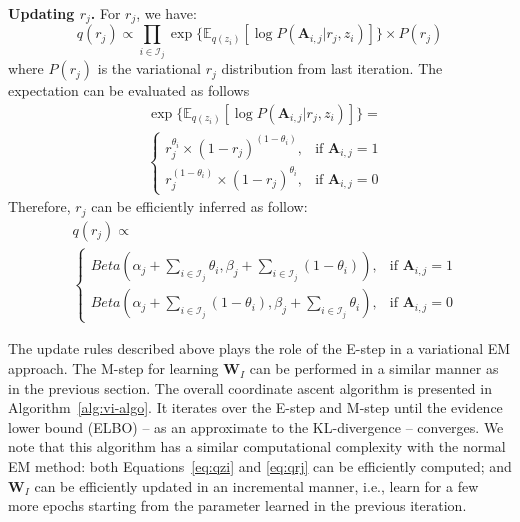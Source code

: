 \smallskip
\noindent\textbf{Updating $r_j$.}  For $r_j$, we have:
%
\begin{equation}
    q(r_j) \propto \prod_{i \in \mathcal{I}_j} \exp{\{\mathbb{E}_{q(z_i)}[\log{P(\mathbf{A}_{i,j}|r_j,z_i)}]\}} \times   {P(r_j)}
\end{equation}
%
where $P(r_j)$ is the variational $r_j$ distribution from last iteration. The expectation can be evaluated as follows
%
\begin{align}  
& \exp{\{\mathbb{E}_{q(z_i)}[\log{P(\mathbf{A}_{i,j}|r_j,z_i)}]\}} = \nonumber \\
& 
\left\{  
    \begin{array}{lr}
        r_j^{\theta_i}  \times (1-r_j)^{(1 - \theta_i)}, &  \text{if\ } \mathbf{A}_{i,j}=1\\  
        r_j^{(1 - \theta_i)}  \times (1-r_j)^{\theta_i}, &  \text{if\ } \mathbf{A}_{i,j}=0   
    \end{array}  
\right.  
\end{align}
%
Therefore, $r_j$ can be efficiently inferred as follow:
%
\begin{align}  
& q(r_j)  \propto \nonumber \\
& 
\left\{  
    \begin{array}{lr}
        Beta(\alpha_j+\sum_{i\in \mathcal{I}_j}  \theta_i,\beta_j+ \sum_{i\in \mathcal{I}_j} (1 - \theta_i) ), &  \text{if\ } \mathbf{A}_{i,j}=1\\  
        Beta(\alpha_j+\sum_{i\in \mathcal{I}_j} (1 - \theta_i),\beta_j+ \sum_{i\in \mathcal{I}_j} \theta_i), &  \text{if\ } \mathbf{A}_{i,j}=0   
    \end{array}  
\right.  
\label{eq:qrj}
\end{align}



The update rules described above plays the role of the E-step in a variational EM approach. 
The M-step for learning $\mathbf{W}_I$ can be performed in a similar manner as in the previous section. The overall coordinate ascent algorithm is presented in Algorithm~\ref{alg:vi-algo}. It iterates over the E-step and M-step until the evidence lower bound (ELBO) \cite{blei2017variational} -- as an approximate to the KL-divergence -- converges. We note that this algorithm has a similar computational complexity with the normal EM method: both Equations~\ref{eq:qzi} and \ref{eq:qrj} can be efficiently computed; and $\mathbf{W}_I$ can be efficiently updated in an incremental manner, i.e., learn for a few more epochs starting from the parameter learned in the previous iteration.

